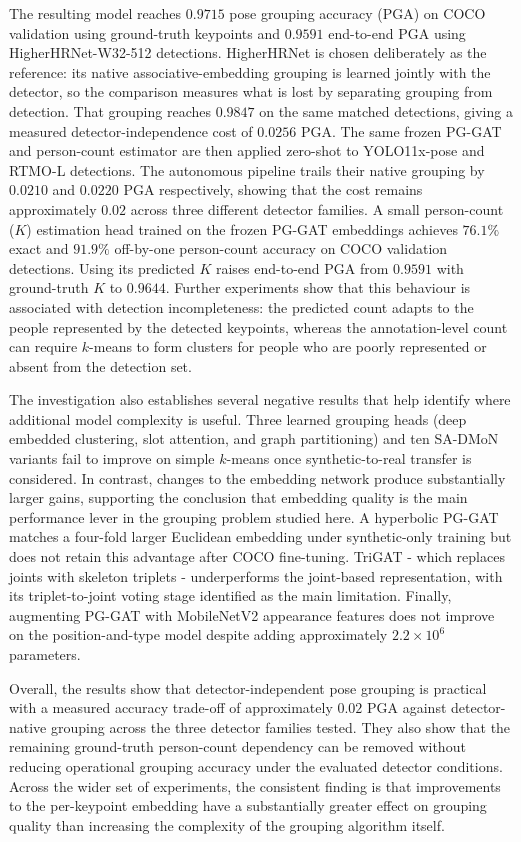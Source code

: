 The resulting model reaches $0.9715$ pose grouping accuracy (PGA) on COCO validation
using ground-truth keypoints
and $0.9591$ end-to-end PGA using HigherHRNet-W32-512 detections.
HigherHRNet is chosen deliberately as the reference:
its native associative-embedding grouping is learned jointly with the detector,
so the comparison measures what is lost by separating grouping from detection.
That grouping reaches $0.9847$ on the same matched detections,
giving a measured detector-independence cost of $0.0256$ PGA.
The same frozen PG-GAT and person-count estimator
are then applied zero-shot to YOLO11x-pose and RTMO-L detections.
The autonomous pipeline trails their native grouping by $0.0210$ and $0.0220$ PGA respectively,
showing that the cost remains approximately $0.02$ across three different detector families.
A small person-count ($K$) estimation head trained on the frozen PG-GAT embeddings
achieves $76.1\%$ exact and $91.9\%$ off-by-one person-count accuracy on COCO validation detections.
Using its predicted $K$ raises end-to-end PGA from $0.9591$ with ground-truth $K$ to $0.9644$.
Further experiments show that this behaviour is associated with detection incompleteness:
the predicted count adapts to the people represented by the detected keypoints,
whereas the annotation-level count can require $k$-means to form clusters
for people who are poorly represented or absent from the detection set.

The investigation also establishes several negative results
that help identify where additional model complexity is useful.
Three learned grouping heads (deep embedded clustering, slot attention, and graph partitioning)
and ten SA-DMoN variants
fail to improve on simple $k$-means once synthetic-to-real transfer is considered.
In contrast, changes to the embedding network produce substantially larger gains,
supporting the conclusion that embedding quality is the main performance lever
in the grouping problem studied here.
A hyperbolic PG-GAT matches a four-fold larger Euclidean embedding under synthetic-only training
but does not retain this advantage after COCO fine-tuning.
TriGAT - which replaces joints with skeleton triplets - underperforms the joint-based representation,
with its triplet-to-joint voting stage identified as the main limitation.
Finally, augmenting PG-GAT with MobileNetV2 appearance features
does not improve on the position-and-type model
despite adding approximately $2.2 \times 10^{6}$ parameters.

Overall, the results show that detector-independent pose grouping is practical
with a measured accuracy trade-off of approximately $0.02$ PGA
against detector-native grouping across the three detector families tested.
They also show that the remaining ground-truth person-count dependency can be removed
without reducing operational grouping accuracy under the evaluated detector conditions.
Across the wider set of experiments,
the consistent finding is that improvements to the per-keypoint embedding
have a substantially greater effect on grouping quality
than increasing the complexity of the grouping algorithm itself.

\newpage

